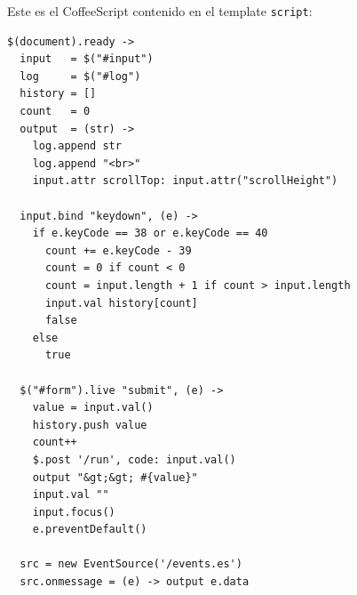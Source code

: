 Este es el CoffeeScript contenido en 
el template \verb|script|:
\begin{verbatim}
$(document).ready ->
  input   = $("#input")
  log     = $("#log")
  history = []
  count   = 0
  output  = (str) ->
    log.append str
    log.append "<br>"
    input.attr scrollTop: input.attr("scrollHeight")

  input.bind "keydown", (e) ->
    if e.keyCode == 38 or e.keyCode == 40
      count += e.keyCode - 39
      count = 0 if count < 0
      count = input.length + 1 if count > input.length
      input.val history[count]
      false
    else
      true

  $("#form").live "submit", (e) ->
    value = input.val()
    history.push value
    count++
    $.post '/run', code: input.val()
    output "&gt;&gt; #{value}"
    input.val ""
    input.focus()
    e.preventDefault()

  src = new EventSource('/events.es')
  src.onmessage = (e) -> output e.data
\end{verbatim}
